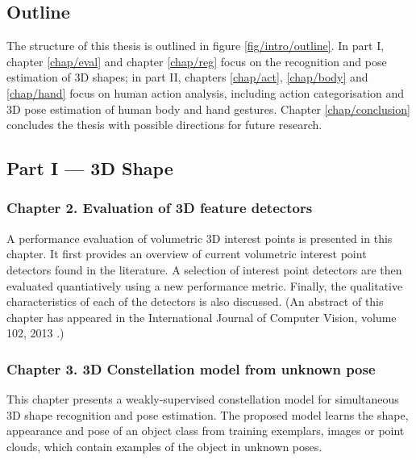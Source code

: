 \subsection{Outline}

The structure of this thesis is outlined in figure \ref{fig/intro/outline}. In part I, chapter \ref{chap/eval} and chapter \ref{chap/reg} focus on the recognition and pose estimation of 3D shapes; in part II, chapters \ref{chap/act}, \ref{chap/body} and \ref{chap/hand} focus on human action analysis, including action categorisation and 3D pose estimation of human body and hand gestures. Chapter \ref{chap/conclusion} concludes the thesis with possible directions for future research. 

\subsection*{Part I --- 3D Shape}


\subsubsection*{Chapter 2. Evaluation of 3D feature detectors} 
A performance evaluation of volumetric 3D interest points is presented in this chapter. 
It first provides an overview of current volumetric interest point detectors found in the literature. A selection of interest point detectors are then evaluated quantiatively using a new performance metric. Finally, the qualitative characteristics of each of the detectors is also discussed. 
(An abstract of this chapter has appeared in the International Journal of Computer Vision, volume 102, 2013 \cite{Yu2013a}.)  

\subsubsection*{Chapter 3. 3D Constellation model from unknown pose}
This chapter presents a weakly-supervised constellation model for simultaneous 3D shape recognition and pose estimation. 
The proposed model learns the shape, appearance and pose of an object class from training exemplars, \eg images or point clouds, which contain examples of the object in unknown poses.  

